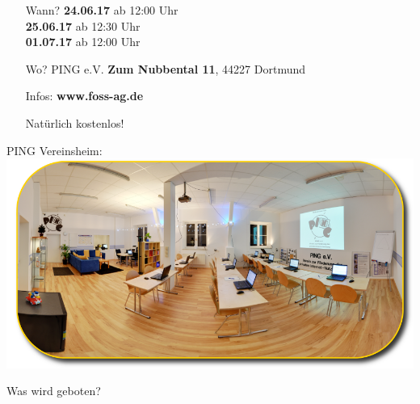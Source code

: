 \documentclass{beamer}
\begin{document}
\begin{frame}
		\vspace{0.2cm}
		\begin{minipage}{0.56\linewidth}
			\begin{itemize}
				\item[Wann?] \textbf{24.06.17} ab 12:00 Uhr \\
				\textbf{25.06.17} ab 12:30 Uhr\\
				\textbf{01.07.17} ab 12:00 Uhr
				\item[Wo?] PING e.V. \textbf{Zum Nubbental 11}, 44227 Dortmund
				\item[Infos:] \textbf{www.foss-ag.de}
				\item[] Natürlich kostenlos!
			\end{itemize}
		\end{minipage}
		\begin{minipage}{0.35\linewidth}
			{\scriptsize \hspace{0.03cm} PING Vereinsheim: \\ }
			\includegraphics[scale=0.37]{weiterbildung-schulungsraum}
		\end{minipage}
	
		\vspace{0.5cm}
		Was wird geboten?
	

\end{frame}
\end{document}
